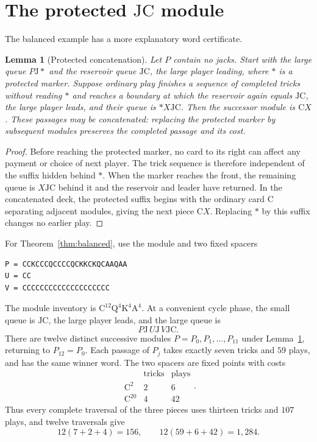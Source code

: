 \documentclass[11pt]{article}
\newtheorem{lemma}{Lemma}
\newcommand{\C}{\mathrm C}
\newcommand{\J}{\mathrm J}
\newcommand{\Q}{\mathrm Q}
\newcommand{\K}{\mathrm K}
\renewcommand{\AA}{\mathrm A}
\begin{document}
\section{The protected $\J\C$ module}
The balanced example has a more explanatory word certificate.

\begin{lemma}[Protected concatenation]\label{lem:protected}
Let $P$ contain no jacks. Start with the large queue $P\J*$ and the
reservoir queue $\J\C$, the large player leading, where $*$ is a
protected marker. Suppose ordinary play finishes a sequence of completed
tricks without reading $*$ and reaches a boundary at which the reservoir
again equals $\J\C$, the large player leads, and their queue is
$*X\J\C$. Then the \emph{successor module} is $\C X$.
These passages may be concatenated: replacing the protected marker by
subsequent modules preserves the completed passage and its cost.
\end{lemma}
\begin{proof}
Before reaching the protected marker, no card to its right can affect any
payment or choice of next player. The trick sequence is therefore independent
of the suffix hidden behind $*$. When the marker reaches the front, the
remaining queue is $X\J\C$ behind it and the reservoir and leader have
returned. In the concatenated deck, the protected suffix begins with the
ordinary card $\C$ separating adjacent modules, giving the next piece
$\C X$. Replacing $*$ by this suffix changes no earlier play.
\end{proof}

For Theorem~\ref{thm:balanced}, use the module and two fixed spacers
\begin{verbatim}
P = CCKCCCQCCCCQCKKCKQCAAQAA
U = CC
V = CCCCCCCCCCCCCCCCCCCC
\end{verbatim}
The module inventory is $\C^{12}\Q^4\K^4\AA^4$. At a convenient cycle
phase, the small queue is $\J\C$, the large player leads, and the large
queue is
\[
P\J\,U\J\,V\J\C.
\]
There are twelve distinct successive modules $P=P_0,P_1,\ldots,P_{11}$
under Lemma~\ref{lem:protected}, returning to $P_{12}=P_0$. Each passage
of $P_j$ takes exactly seven tricks and $59$ plays, and has the same
winner word. The two spacers are fixed points with costs
\[
\begin{array}{c|cc}
&\text{tricks}&\text{plays}\\\hline
\C^2&2&6\\
\C^{20}&4&42
\end{array}.
\]
Thus every complete traversal of the three pieces uses thirteen tricks and
$107$ plays, and twelve traversals give
\[
 12(7+2+4)=156,\qquad 12(59+6+42)=1{,}284.
\]
\end{document}
